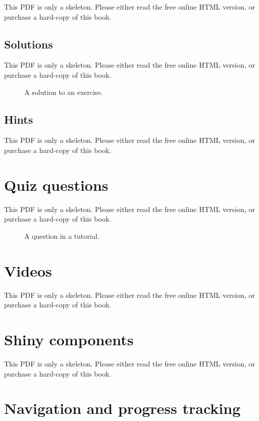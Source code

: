 \documentclass[
  11pt,
]{krantz}
\theoremstyle{definition}
\theoremstyle{definition}
\theoremstyle{definition}
\theoremstyle{definition}
\theoremstyle{remark}
\begin{document}
This PDF is only a skeleton. Please either read the free online HTML version, or purchase a hard-copy of this book.

\subsection{Solutions}\label{solutions}

This PDF is only a skeleton. Please either read the free online HTML version, or purchase a hard-copy of this book.

\begin{figure}\caption{A solution to an exercise.}\end{figure}

\subsection{Hints}\label{hints}

This PDF is only a skeleton. Please either read the free online HTML version, or purchase a hard-copy of this book.

\section{Quiz questions}\label{learnr-quiz}

This PDF is only a skeleton. Please either read the free online HTML version, or purchase a hard-copy of this book.

\begin{figure}\caption{A question in a tutorial.}\end{figure}

\section{Videos}\label{learnr-videos}

This PDF is only a skeleton. Please either read the free online HTML version, or purchase a hard-copy of this book.

\section{Shiny components}\label{learnr-shiny}

This PDF is only a skeleton. Please either read the free online HTML version, or purchase a hard-copy of this book.

\section{Navigation and progress tracking}\label{learnr-nav}
\end{document}
